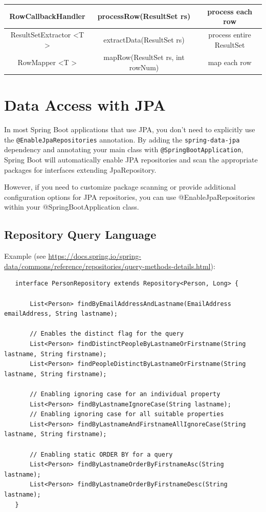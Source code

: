 \documentclass{scrartcl}
\begin{document}
\begin{tabular}{|c|c|c|}
    \hline
    RowCallbackHandler&  processRow(ResultSet rs)& process each row
    \\
    \hline
    ResultSetExtractor \textless T \textgreater& extractData(ResultSet rs)
    & process entire ResultSet\\
    \hline
    RowMapper \textless T \textgreater& mapRow(ResultSet rs, int rowNum)
    &  map each row \\
    \hline
\end{tabular}


\section{Data Access with JPA}

In most Spring Boot applications that use JPA, you don’t need to explicitly use the \lstinline|@EnableJpaRepositories| annotation. By adding the \lstinline|spring-data-jpa| dependency and annotating your main class with \lstinline|@SpringBootApplication|, Spring Boot will automatically enable JPA repositories and scan the appropriate packages for interfaces extending JpaRepository.

However, if you need to customize package scanning or provide additional configuration options for JPA repositories, you can use @EnableJpaRepositories within your @SpringBootApplication class.

\subsection{Repository Query Language}

Example (see \url{  https://docs.spring.io/spring-data/commons/reference/repositories/query-methods-details.html}):


\begin{lstlisting}
   interface PersonRepository extends Repository<Person, Long> {

       List<Person> findByEmailAddressAndLastname(EmailAddress emailAddress, String lastname);

       // Enables the distinct flag for the query
       List<Person> findDistinctPeopleByLastnameOrFirstname(String lastname, String firstname);
       List<Person> findPeopleDistinctByLastnameOrFirstname(String lastname, String firstname);

       // Enabling ignoring case for an individual property
       List<Person> findByLastnameIgnoreCase(String lastname);
       // Enabling ignoring case for all suitable properties
       List<Person> findByLastnameAndFirstnameAllIgnoreCase(String lastname, String firstname);

       // Enabling static ORDER BY for a query
       List<Person> findByLastnameOrderByFirstnameAsc(String lastname);
       List<Person> findByLastnameOrderByFirstnameDesc(String lastname);
   }
\end{lstlisting}
\end{document}
